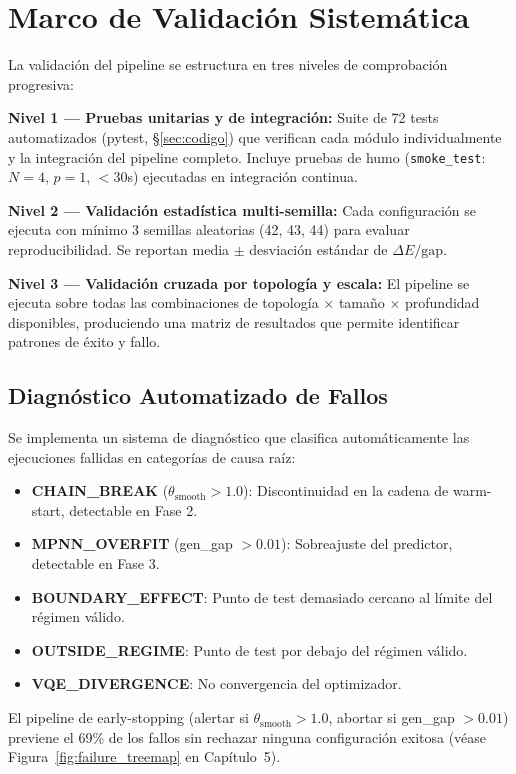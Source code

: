\documentclass[11pt,a4paper,spanish]{book}
\begin{document}
\section{Marco de Validación Sistemática}

La validación del pipeline se estructura en tres niveles de comprobación progresiva:

\textbf{Nivel 1 --- Pruebas unitarias y de integración:} Suite de 72 tests automatizados (pytest, §\ref{sec:codigo}) que verifican cada módulo individualmente y la integración del pipeline completo. Incluye pruebas de humo (\texttt{smoke\_test}: $N=4$, $p=1$, $<30$s) ejecutadas en integración continua.

\textbf{Nivel 2 --- Validación estadística multi-semilla:} Cada configuración se ejecuta con mínimo 3 semillas aleatorias (42, 43, 44) para evaluar reproducibilidad. Se reportan media $\pm$ desviación estándar de $\Delta E/\text{gap}$.

\textbf{Nivel 3 --- Validación cruzada por topología y escala:} El pipeline se ejecuta sobre todas las combinaciones de topología $\times$ tamaño $\times$ profundidad disponibles, produciendo una matriz de resultados que permite identificar patrones de éxito y fallo.

\subsection{Diagnóstico Automatizado de Fallos}

Se implementa un sistema de diagnóstico que clasifica automáticamente las ejecuciones fallidas en categorías de causa raíz:

\begin{itemize}
    \item \textbf{CHAIN\_BREAK} ($\theta_{\text{smooth}} > 1.0$): Discontinuidad en la cadena de warm-start, detectable en Fase 2.
    \item \textbf{MPNN\_OVERFIT} (gen\_gap $> 0.01$): Sobreajuste del predictor, detectable en Fase 3.
    \item \textbf{BOUNDARY\_EFFECT}: Punto de test demasiado cercano al límite del régimen válido.
    \item \textbf{OUTSIDE\_REGIME}: Punto de test por debajo del régimen válido.
    \item \textbf{VQE\_DIVERGENCE}: No convergencia del optimizador.
\end{itemize}

El pipeline de early-stopping (alertar si $\theta_{\text{smooth}} > 1.0$, abortar si gen\_gap $> 0.01$) previene el 69\% de los fallos sin rechazar ninguna configuración exitosa (véase Figura~\ref{fig:failure_treemap} en Capítulo~5).
\end{document}
